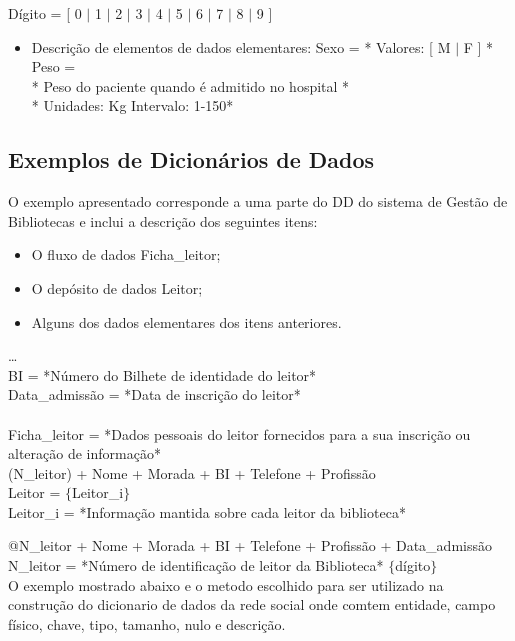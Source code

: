 \documentclass[12pt,a4paper]{article}
\begin{document}
Dígito = [ 0 $\vert$ 1 $\vert$ 2 $\vert$ 3 $\vert$ 4 $\vert$ 5 $\vert$ 6 $\vert$ 7 $\vert$ 8 $\vert$ 9 ]


\begin{itemize}
\item Descrição de elementos de dados elementares: Sexo = * Valores: [ M $\vert$ F ] *
Peso = \\ * Peso do paciente quando é admitido no hospital *\\
* Unidades: Kg Intervalo: 1-150*
\end{itemize}

\subsection{Exemplos de Dicionários de Dados}

O exemplo apresentado corresponde a uma parte do DD do sistema de Gestão  de Bibliotecas e inclui a descrição dos seguintes itens:

\begin{itemize}
\item O fluxo de dados Ficha\_leitor;
\item O depósito de dados Leitor;
\item Alguns dos dados elementares dos itens anteriores.
\end{itemize}
\ldots\\
BI =  *Número do Bilhete de identidade do leitor*\\
Data\_admissão = *Data de inscrição do leitor*\\\\

Ficha\_leitor = *Dados pessoais do leitor fornecidos para a sua inscrição ou alteração de informação*\\


(N\_leitor) + Nome + Morada + BI + Telefone + Profissão\\

Leitor = $\lbrace$Leitor\_i$\rbrace$\\

Leitor\_i = *Informação mantida sobre cada leitor da biblioteca*

@N\_leitor + Nome + Morada + BI + Telefone + Profissão + Data\_admissão\\

N\_leitor = *Número de identificação de leitor da Biblioteca* 		$\lbrace$dígito$\rbrace$\\

O exemplo mostrado abaixo e o metodo escolhido para ser utilizado na construção do dicionario de dados da rede social onde comtem entidade, campo físico, chave, tipo, tamanho, nulo e descrição.
\end{document}
